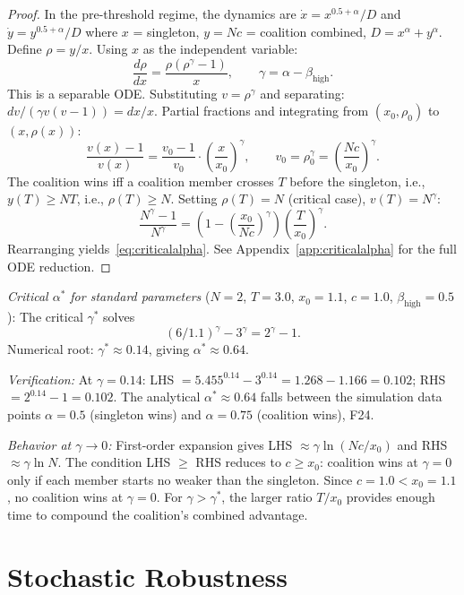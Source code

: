 \documentclass[11pt,letterpaper]{article}
\theoremstyle{plain}
\theoremstyle{definition}
\theoremstyle{remark}
\newcommand{\betaH}{\beta_{\mathrm{high}}}
\begin{document}
\begin{proof}
In the pre-threshold regime, the dynamics are
$\dot{x} = x^{0.5+\alpha}/D$ and $\dot{y} = y^{0.5+\alpha}/D$
where $x$ = singleton, $y = Nc$ = coalition combined, $D = x^\alpha + y^\alpha$.
Define $\rho = y/x$.
Using $x$ as the independent variable:
\[
  \frac{d\rho}{dx}
  = \frac{\rho(\rho^\gamma - 1)}{x}, \qquad \gamma = \alpha - \betaH.
\]
This is a separable ODE.
Substituting $v = \rho^\gamma$ and separating:
$dv / (\gamma v(v-1)) = dx/x$.
Partial fractions and integrating from $(x_0, \rho_0)$ to $(x, \rho(x))$:
\[
  \frac{v(x) - 1}{v(x)}
  = \frac{v_0 - 1}{v_0} \cdot \left(\frac{x}{x_0}\right)^\gamma,
  \qquad v_0 = \rho_0^\gamma = \left(\frac{Nc}{x_0}\right)^\gamma.
\]
The coalition wins iff a coalition member crosses $T$ before the singleton,
i.e., $y(T) \geq NT$, i.e., $\rho(T) \geq N$.
Setting $\rho(T) = N$ (critical case), $v(T) = N^\gamma$:
\[
  \frac{N^\gamma - 1}{N^\gamma}
  = \left(1 - \left(\frac{x_0}{Nc}\right)^\gamma\right)
    \left(\frac{T}{x_0}\right)^\gamma.
\]
Rearranging yields~\eqref{eq:criticalalpha}.
See Appendix~\ref{app:criticalalpha} for the full ODE reduction.
\end{proof}

\textit{Critical $\alpha^*$ for standard parameters} ($N = 2$, $T = 3.0$,
$x_0 = 1.1$, $c = 1.0$, $\betaH = 0.5$):
The critical $\gamma^*$ solves
\[
  (6/1.1)^\gamma - 3^\gamma = 2^\gamma - 1.
\]
Numerical root: $\gamma^* \approx 0.14$, giving $\alpha^* \approx 0.64$.

\textit{Verification:} At $\gamma = 0.14$: LHS $= 5.455^{0.14} - 3^{0.14}
= 1.268 - 1.166 = 0.102$; RHS $= 2^{0.14} - 1 = 0.102$. \checkmark
The analytical $\alpha^* \approx 0.64$ falls between the simulation data points
$\alpha = 0.5$ (singleton wins) and $\alpha = 0.75$ (coalition wins), F24. \checkmark

\textit{Behavior at $\gamma \to 0$:}
First-order expansion gives LHS $\approx \gamma \ln(Nc/x_0)$ and
RHS $\approx \gamma \ln N$.
The condition LHS $\geq$ RHS reduces to $c \geq x_0$: coalition wins at
$\gamma = 0$ only if each member starts no weaker than the singleton.
Since $c = 1.0 < x_0 = 1.1$, no coalition wins at $\gamma = 0$.
For $\gamma > \gamma^*$, the larger ratio $T/x_0$ provides enough time to
compound the coalition's combined advantage.

\section{Stochastic Robustness}
\label{sec:stochastic}
\end{document}
